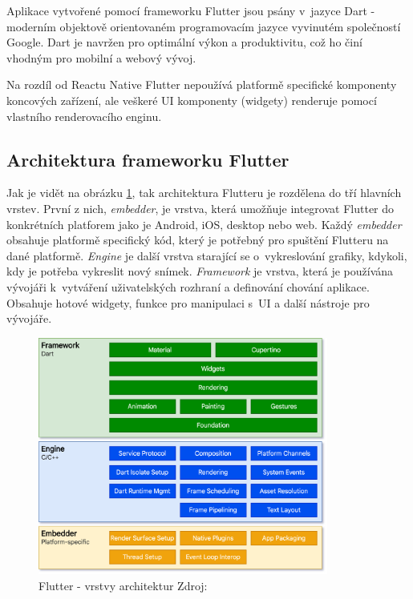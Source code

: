 Aplikace vytvořené pomocí frameworku Flutter jsou psány v~jazyce Dart - moderním objektově orientovaném programovacím jazyce 
vyvinutém společností Google. Dart je navržen pro optimální výkon a produktivitu, což ho činí vhodným pro mobilní a
webový vývoj. \cite{dart}

Na rozdíl od Reactu Native Flutter nepoužívá platformě specifické komponenty koncových zařízení, ale veškeré UI komponenty (widgety)
renderuje pomocí vlastního renderovacího enginu. \cite{flutterRenderingModel}


\subsection*{Architektura frameworku Flutter} 
Jak je vidět na obrázku \ref{fig:flutter_architectural_layers}, tak architektura Flutteru je rozdělena do tří hlavních vrstev. \cite{flutterArchOverview}
První z nich, \textit{embedder}, je vrstva, která umožňuje integrovat Flutter do konkrétních platforem jako je Android, iOS, desktop nebo web. 
Každý \textit{embedder} obsahuje platformě specifický kód, který je potřebný pro spuštění Flutteru na dané platformě.
\textit{Engine} je další vrstva starající se o~vykreslování grafiky, kdykoli, kdy je potřeba vykreslit nový snímek. \cite{flutterArchOverview} 
\textit{Framework} je vrstva, která je používána vývojáři k~vytváření uživatelských rozhraní a definování chování aplikace. 
Obsahuje hotové widgety, funkce pro manipulaci s~UI a další nástroje pro vývojáře. \cite{flutterArchOverview} 


\begin{figure}[H]
  \centering
  \includegraphics[width=0.85\textwidth]{flutter_architectural_layers.png}
  \caption{Flutter - vrstvy architektur Zdroj: \cite{flutterUI}}
  \label{fig:flutter_architectural_layers}
\end{figure}

